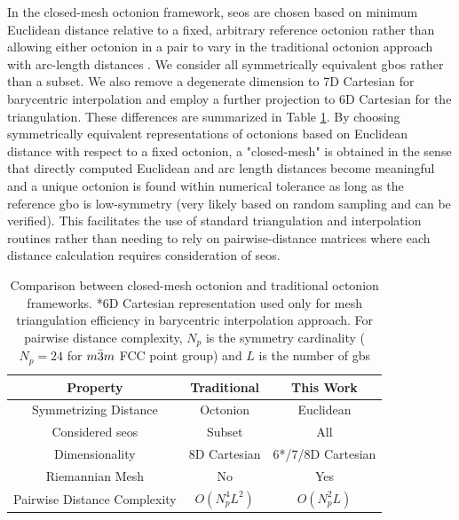 \documentclass[preprint,12pt]{elsarticle}
\begin{document}
In the closed-mesh octonion framework, \glspl{seo} are chosen based on minimum Euclidean distance relative to a fixed, arbitrary reference octonion rather than allowing either octonion in a pair to vary in the traditional octonion approach with arc-length distances \cite{francisGeodesicOctonionMetric2019}. We consider all symmetrically equivalent \glspl{gbo} rather than a subset. We also remove a degenerate dimension to 7D Cartesian for barycentric interpolation and employ a further projection to 6D Cartesian for the triangulation. These differences are summarized in Table \ref{tab:closed-mesh-comparison}. By choosing symmetrically equivalent representations of octonions based on Euclidean distance with respect to a fixed octonion, a "closed-mesh" is obtained in the sense that directly computed Euclidean and arc length distances become meaningful and a unique octonion is found within numerical tolerance as long as the reference \gls{gbo} is low-symmetry (very likely based on random sampling and can be verified). This facilitates the use of standard triangulation and interpolation routines rather than needing to rely on pairwise-distance matrices where each distance calculation requires consideration of \glspl{seo}.

\begin{table}[] \label{tab:closed-mesh-comparison}
\caption{Comparison between closed-mesh octonion and traditional octonion frameworks. *6D Cartesian representation used only for mesh triangulation efficiency in barycentric interpolation approach. For pairwise distance complexity, $N_p$ is the symmetry cardinality ($N_p=24$ for $m\Bar{3}m$ FCC point group) and $L$ is the number of \glspl{gb}}
\centering
\begin{tabular}{ccc}
\hline
Property                                        & Traditional   & This Work                \\
\hline
Symmetrizing Distance                   & Octonion      & Euclidean                \\
Considered \glspl{seo}                  & Subset         & All                      \\
Dimensionality                          & 8D Cartesian  & 6*/7/8D Cartesian \\
Riemannian Mesh                         & No            & Yes                      \\
Pairwise Distance Complexity            & $O(N_p^4L^2)$ & $O(N_p^2L)$             
\end{tabular}
\end{table}
\end{document}
